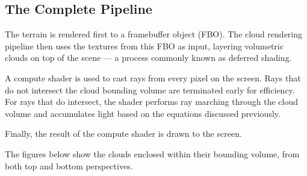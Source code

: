 \subsection{The Complete Pipeline}
The terrain is rendered first to a framebuffer object (FBO). The cloud rendering pipeline then uses the textures from this FBO as input, layering volumetric clouds on top of the scene — a process commonly known as deferred shading.

A compute shader is used to cast rays from every pixel on the screen. Rays that do not intersect the cloud bounding volume are terminated early for efficiency. For rays that do intersect, the shader performs ray marching through the cloud volume and accumulates light based on the equations discussed previously.

Finally, the result of the compute shader is drawn to the screen.

The figures below show the clouds enclosed within their bounding volume, from both top and bottom perspectives.

